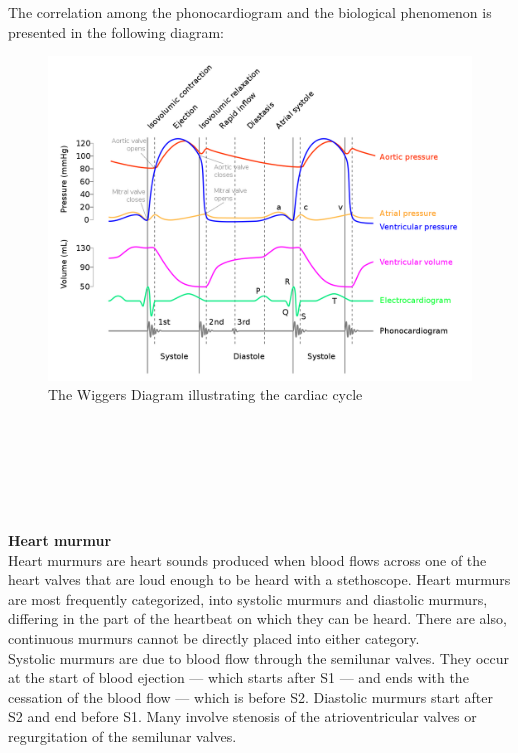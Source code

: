 \documentclass[11pt, a4papper]{report}
\theoremstyle{plain}
\theoremstyle{definition}
\theoremstyle{definition}
\theoremstyle{proposition}
\begin{document}
The correlation among the phonocardiogram and the biological phenomenon is presented in the following diagram:

\begin{figure}[h]
\includegraphics[width=15cm]{Wiggers_Diagram_2.png}
\centering
\caption{The Wiggers Diagram illustrating the cardiac cycle}
\end{figure}
\
\\
\
\\
\
\\
\
\\
\

\textbf{Heart murmur}
\\

Heart murmurs are heart sounds produced when blood flows across one of the heart valves that are loud enough to be heard with a stethoscope. Heart murmurs are most frequently categorized, into systolic murmurs and diastolic murmurs, differing in the part of the heartbeat on which they can be heard. There are also, continuous murmurs cannot be directly placed into either category.
\\

Systolic murmurs are due to blood flow through the semilunar valves. They occur at the start of blood ejection — which starts after S1 — and ends with the cessation of the blood flow — which is before S2. Diastolic murmurs start after S2 and end before S1. Many involve stenosis of the atrioventricular valves or regurgitation of the semilunar valves. \cite{10}
\\
\
\\
\end{document}
